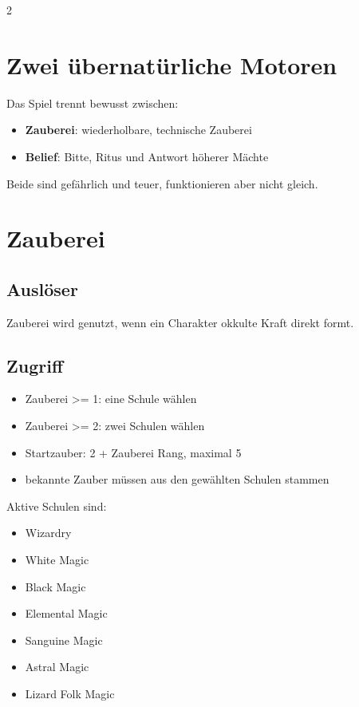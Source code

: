 \label{ch:magie}

\begin{multicols*}{2}
\section{Zwei übernatürliche Motoren}
Das Spiel trennt bewusst zwischen:
\begin{itemize}[leftmargin=*]
\item \textbf{Zauberei}: wiederholbare, technische Zauberei
\item \textbf{Belief}: Bitte, Ritus und Antwort höherer Mächte
\end{itemize}

Beide sind gefährlich und teuer, funktionieren aber nicht gleich.

\section{Zauberei}
\subsection{Auslöser}
Zauberei wird genutzt, wenn ein Charakter okkulte Kraft direkt formt.

\subsection{Zugriff}
\begin{itemize}[leftmargin=*]
\item Zauberei >= 1: eine Schule wählen
\item Zauberei >= 2: zwei Schulen wählen
\item Startzauber: 2 + Zauberei Rang, maximal 5
\item bekannte Zauber müssen aus den gewählten Schulen stammen
\end{itemize}

Aktive Schulen sind:
\begin{itemize}[leftmargin=*]
\item Wizardry
\item White Magic
\item Black Magic
\item Elemental Magic
\item Sanguine Magic
\item Astral Magic
\item Lizard Folk Magic
\end{itemize}


\end{multicols*}
